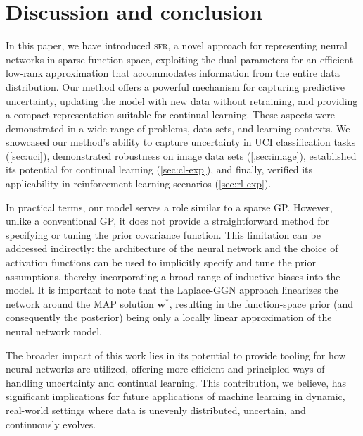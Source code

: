 \documentclass{article}
\newcommand{\our}{\textsc{sfr}\xspace}
\newcommand{\weights}{\ensuremath{\mathbf{w}}}
\begin{document}
\section{Discussion and conclusion}
\label{sec:conclusion}
%
In this paper, we have introduced \our, a novel approach for representing neural networks in sparse function space, exploiting the dual parameters for an efficient low-rank approximation that accommodates information from the entire data distribution. Our method offers a powerful mechanism for capturing predictive uncertainty, updating the model with new data without retraining, and providing a compact representation suitable for continual learning. These aspects were demonstrated in a wide range of problems, data sets, and learning contexts. We showcased our method's ability to capture uncertainty in UCI classification tasks (\cref{sec:uci}), demonstrated robustness on image data sets (\cref{,sec:image}), established its potential for continual learning (\cref{sec:cl-exp}), and finally, verified its applicability in reinforcement learning scenarios (\cref{sec:rl-exp}).

In practical terms, our model serves a role similar to a sparse GP. However, unlike a conventional GP, it does not provide a straightforward method for specifying or tuning the prior covariance function. This limitation can be addressed indirectly: the architecture of the neural network and the choice of activation functions can be used to implicitly specify and tune the prior assumptions, thereby incorporating a broad range of inductive biases into the model. It is important to note that the Laplace-GGN approach linearizes the network around the MAP solution $\weights^{*}$, resulting in the function-space prior (and consequently the posterior) being only a locally linear approximation of the neural network model.




The broader impact of this work lies in its potential to provide tooling for how neural networks are utilized, offering more efficient and principled ways of handling uncertainty and continual learning. This contribution, we believe, has significant implications for future applications of machine learning in dynamic, real-world settings where data is unevenly distributed, uncertain, and continuously evolves.
\end{document}
